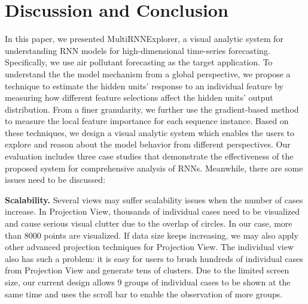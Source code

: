 \section{Discussion and Conclusion}

In this paper, we presented MultiRNNExplorer, a visual analytic system for understanding RNN models for high-dimensional time-series forecasting.
Specifically, we use air pollutant forecasting as the target application. 
To understand the the model mechanism from a global perspective, we propose a technique to estimate the hidden units' response to an individual feature by measuring how different feature selections affect the hidden units' output distribution. 
From a finer granularity, we further use the gradient-based method to measure the local feature importance for each sequence instance. 
Based on these techniques, we design a visual analytic system which enables the users to explore and reason about the model behavior from different perspectives. 
Our evaluation includes three case studies that demonstrate the effectiveness of the proposed system for comprehensive analysis of RNNs.
Meanwhile, there are some issues need to be discussed:

\textbf{Scalability.}
Several views may suffer scalability issues when the number of cases increase. 
In Projection View, thousands of individual cases need to be visualized and cause serious visual clutter due to the overlap of circles.  
In our case, more than 8000 points are visualized. 
If data size keeps increasing, we may also apply other advanced projection techniques\cite{van2017visual, pezzotti2016hierarchical} for Projection View. 
The individual view also has such a problem: it is easy for users to brush hundreds of individual cases from Projection View and generate tens of clusters. Due to the limited screen size, our current design allows 9 groups of individual cases to be shown at the same time and uses the scroll bar to enable the observation of more groups.

